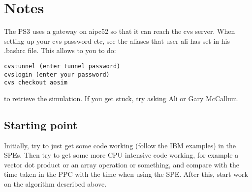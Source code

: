 \documentclass{article}
\begin{document}
\section{Notes}
The PS3 uses a gateway on aipc52 so that it can reach the cvs server.
When setting up your cvs password etc, see the aliases that user ali
has set in his .bashrc file.  This allows to you to do:
\begin{verbatim}
cvstunnel (enter tunnel password)
cvslogin (enter your password)
cvs checkout aosim
\end{verbatim}
to retrieve the simulation.  If you get stuck, try asking Ali or Gary
McCallum.

\subsection{Starting point}
Initially, try to just get some code working (follow the IBM
examples) in the SPEs.  Then try to get some more CPU intensive code
working, for example a vector dot product or an array operation or
something, and compare with the time taken in the PPC with the time
when using the SPE.  After this, start work on the algorithm
described above.



\printindex
\end{document}
